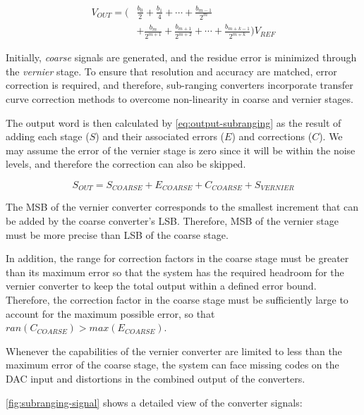\begin{equation}
    \label{eq:subranging-summation}
    \begin{aligned}
        V_{OUT} = \biggl(&\frac{b_0}{2} + \frac{b_1}{4} + \cdots + \frac{b_{m-1}}{2^m} \\
                         &+ \frac{b_m}{2^{m+1}} + \frac{b_{m+1}}{2^{m+2}} + \cdots
                         + \frac{b_{m+k-1}}{2^{m+k}}\biggr) V_{REF}
    \end{aligned}
\end{equation}

Initially, \emph{coarse} signals are generated, and the residue error is
minimized through the \emph{vernier} stage.
To ensure that resolution and accuracy are matched, error correction is
required, and therefore, sub-ranging converters incorporate transfer curve
correction methods to overcome non-linearity in coarse and vernier stages.

The output word is then calculated by \autoref{eq:output-subranging} as the
result of adding each stage ($S$) and their associated
errors ($E$) and corrections ($C$).
We may assume the error of the vernier stage is zero since it will be
within the noise levels, and therefore the correction can also be skipped.

\begin{equation}
    \label{eq:output-subranging}
    S_{OUT} = {S_{COARSE} + E_{COARSE} + C_{COARSE}} + S_{VERNIER}
\end{equation}

The \ac{MSB} of the vernier converter corresponds to the smallest increment that
can be added by the coarse converter's \ac{LSB}.
Therefore, \ac{MSB} of the vernier stage
must be more precise than \ac{LSB} of the coarse stage.

In addition, the range for correction factors in the coarse stage must be greater than
its maximum error so that the system has the required headroom for the
vernier converter to keep the total output within a defined error bound.
Therefore, the correction factor in the coarse stage must be sufficiently
large to account for the maximum possible error, so that
$ran(C_{COARSE}) > max(E_{COARSE})$.

Whenever the capabilities of the vernier converter are limited
to less than the maximum error of the coarse stage, the system can
face missing codes on the DAC input and distortions in the combined output of
the converters.

\autoref{fig:subranging-signal} shows a detailed view of the converter
signals:

